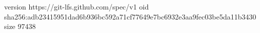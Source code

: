 version https://git-lfs.github.com/spec/v1
oid sha256:adb23415951dad6b936bc592a71cf77649e7bc6932e3aa9fec03be5da11b3430
size 97438
